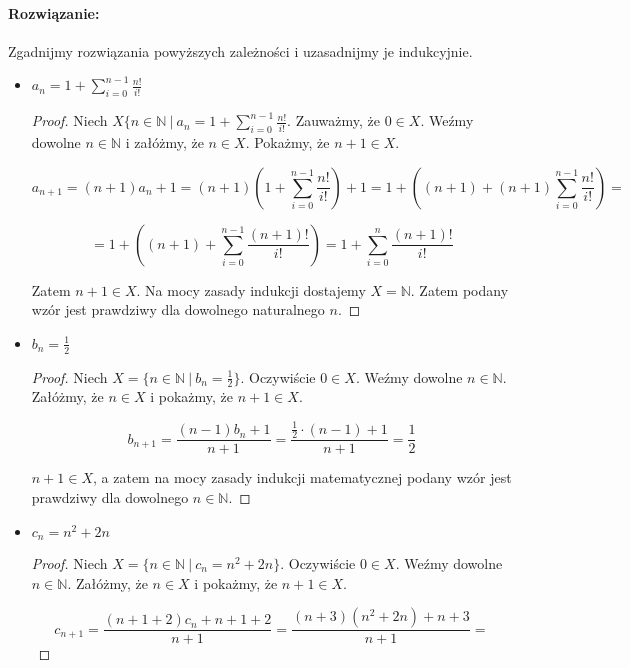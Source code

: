 \documentclass{article}
\newenvironment{rozw}{\paragraph{Rozwiązanie:}}{\hfill}
\begin{document}
\begin{rozw}

Zgadnijmy rozwiązania powyższych zależności i uzasadnijmy je indukcyjnie.

\begin{itemize}

\item $a_n = 1 + \sum_{i=0}^{n-1}{\frac{n!}{i!}}$
\begin{proof}

Niech $X \lbrace n \in \mathbb{N} \ | \ a_n = 1 + \sum_{i=0}^{n-1}{\frac{n!}{i!}}$. Zauważmy, że $0 \in X$. Weźmy dowolne $n \in \mathbb{N}$ i załóżmy, że $n \in X$. Pokażmy, że $n+1 \in X$.

$$a_{n+1} = (n+1)a_n + 1 = (n+1) \left( 1 + \sum_{i=0}^{n-1}{\frac{n!}{i!}} \right) + 1 = 1 + \left( (n+1) + (n+1)\sum_{i=0}^{n-1}{\frac{n!}{i!}}  \right) =
$$

$$
= 1 + \left( (n+1) + \sum_{i=0}^{n-1}{\frac{(n+1)!}{i!}}  \right) = 1 + \sum_{i=0}^{n}{\frac{(n+1)!}{i!}} 
$$

Zatem $n+1 \in X$. Na mocy zasady indukcji dostajemy $X = \mathbb{N}$. Zatem podany wzór jest prawdziwy dla dowolnego naturalnego $n$.

\end{proof}

\item $b_n = \frac{1}{2}$
\begin{proof}

Niech $X = \lbrace n \in \mathbb{N} \ | \ b_n = \frac{1}{2} \rbrace$. Oczywiście $0 \in X$. Weźmy dowolne $n \in \mathbb{N}$. Załóżmy, że $n \in X$ i pokażmy, że $n+1 \in X$.

$$b_{n+1} =  \frac{(n-1)b_{n} + 1}{n+1} = \frac{ \frac{1}{2} \cdot (n-1) + 1 }{n+1}  = \frac{1}{2}$$

$n+1 \in X$, a zatem na mocy zasady indukcji matematycznej podany wzór jest prawdziwy dla dowolnego $n \in \mathbb{N}$.

\end{proof}

\item $c_n = n^2 + 2n$

\begin{proof}

Niech $X = \lbrace n \in \mathbb{N} \ | \ c_n = n^2 + 2n \rbrace$. Oczywiście $0 \in X$. Weźmy dowolne $n \in \mathbb{N}$. Załóżmy, że $n \in X$ i pokażmy, że $n+1 \in X$.

$$c_{n+1} = \frac{(n+1+2)c_{n} + n+1 + 2}{n+1} = \frac{(n+3) (n^2+2n) + n+3}{n+1} =$$


\end{proof}
\end{itemize}
\end{rozw}
\end{document}
